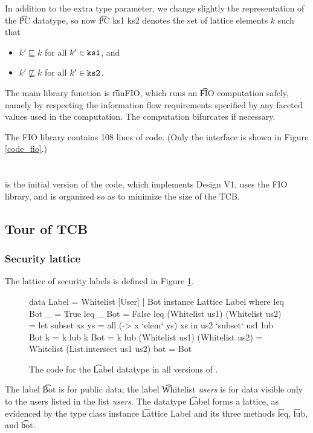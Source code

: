 \begin{refsection}
In addition to the extra type parameter,
we change slightly the representation of the \t{PC} datatype,
so now \t{PC ks1 ks2} denotes the set of lattice elements $k$ such that
\begin{itemize}
  \item
    $k'\sqsubseteq k$ for all $k'\in\texttt{ks1}$, and
  \item
    $k'\not\sqsubseteq k$ for all $k'\in\texttt{ks2}$.
\end{itemize}

The main library function is \t{runFIO},
which runs an \t{FIO} computation safely,
namely by respecting the information flow requirements specified by any faceted values used in the computation.
%
The computation bifurcates if necessary.

The FIO library contains 108 lines of code. (Only the interface is shown in Figure \ref{code_fio}.)

\section{\viF}

\myapp{} \viF{} is the initial version of the code,
which implements Design V1,
uses the FIO library,
and is organized so as to minimize the size of the TCB.

\subsection{Tour of TCB}

\subsubsection{Security lattice}

The lattice of security labels is defined in Figure \ref{code_lattice}.
\begin{figure}
\begin{fb}
data Label = Whitelist [User]
           | Bot
instance Lattice Label where
  leq Bot _ = True
  leq _ Bot = False
  leq (Whitelist us1) (Whitelist us2) =
    let subset xs ys = all (\x -> x `elem` ys) xs  in
    us2 `subset` us1
  lub Bot k = k
  lub k Bot = k
  lub (Whitelist us1) (Whitelist us2) =
    Whitelist (List.intersect us1 us2)
  bot = Bot
\end{fb}
\caption{The code for the \t{Label} datatype in all versions of \myapp{}.}
\label{code_lattice}
\end{figure}
The label \t{Bot} is for public data;
the label \t{Whitelist }\textit{users} is for data visible only to the users listed in the list \textit{users}.
%
The datatype \t{Label} forms a lattice,
as evidenced by the type class instance \t{Lattice Label}
and its three methods \t{leq}, \t{lub}, and \t{bot}.


\end{refsection}
